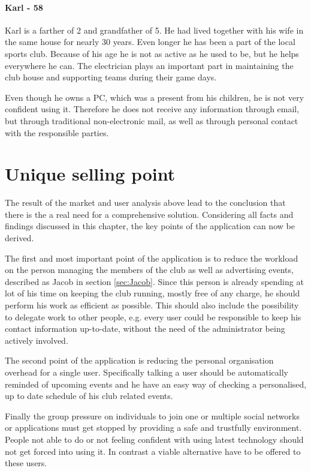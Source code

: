 \paragraph{Karl - 58}
Karl is a farther of 2 and grandfather of 5. He had lived together with his wife in the same house for nearly 30 years. Even longer he has been a part of the local sports club. Because of his age he is not as active as he used to be, but he helps everywhere he can. The electrician plays an important part in maintaining the club house and supporting teams during their game days.

Even though he owns a PC, which was a present from his children, he is not very confident using it. Therefore he does not receive any information through email, but through traditional non-electronic mail, as well as through personal contact with the responsible parties.  

\section{Unique selling point}
\label{sec:SellingPoint}

The result of the market and user analysis above lead to the conclusion that there is the a real need for a comprehensive solution. Considering all facts and findings discussed in this chapter, the key points of the application can now be derived. 

The first and most important point of the application is to reduce the workload on the person managing the members of the club as well as advertising events, described as Jacob in section \vref{sec:Jacob}. Since this person is already spending at lot of his time on keeping the club running, mostly free of any charge, he should perform his work as efficient as possible. This should also include the possibility to delegate work to other people, e.g. every user could be responsible to keep his contact information up-to-date, without the need of the administrator being actively involved.

The second point of the application is reducing the personal organisation overhead for a single user. Specifically talking a user should be automatically reminded of upcoming events and he have an easy way of checking a personalised, up to date schedule of his club related events.

Finally the group pressure on individuals to join one or multiple social networks or applications must get stopped by providing a safe and trustfully environment. People not able to do or not feeling confident with using latest technology should not get forced into using it. In contrast a viable alternative have to be offered to these users. 

